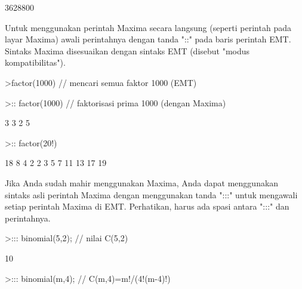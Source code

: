 \documentclass{article}
\newenvironment{eulernotebook}{\par}{\par}
\newenvironment{eulercomment}{\par\medskip}{\par\medskip}
\begin{document}
\begin{eulernotebook}
\begin{euleroutput}
                                 3628800
  
\end{euleroutput}
\begin{eulercomment}
Untuk menggunakan perintah Maxima secara langsung (seperti perintah pada layar
Maxima) awali perintahnya dengan tanda "::" pada baris perintah EMT. Sintaks
Maxima disesuaikan dengan sintaks EMT (disebut "modus kompatibilitas").
\end{eulercomment}
\begin{eulerprompt}
>factor(1000) // mencari semua faktor 1000 (EMT)
\end{eulerprompt}
\begin{euleroutput}
  [2,  2,  2,  5,  5,  5]
\end{euleroutput}
\begin{eulerprompt}
>:: factor(1000) // faktorisasi prima 1000 (dengan Maxima) 
\end{eulerprompt}
\begin{euleroutput}
  
                                   3  3
                                  2  5
  
\end{euleroutput}
\begin{eulerprompt}
>:: factor(20!)
\end{eulerprompt}
\begin{euleroutput}
  
                          18  8  4  2
                         2   3  5  7  11 13 17 19
  
\end{euleroutput}
\begin{eulercomment}
Jika Anda sudah mahir menggunakan Maxima, Anda dapat menggunakan sintaks asli
perintah Maxima dengan menggunakan tanda ":::" untuk mengawali setiap perintah
Maxima di EMT. Perhatikan, harus ada spasi antara ":::" dan perintahnya.
\end{eulercomment}
\begin{eulerprompt}
>::: binomial(5,2); // nilai C(5,2)
\end{eulerprompt}
\begin{euleroutput}
  
                                    10
  
\end{euleroutput}
\begin{eulerprompt}
>::: binomial(m,4); // C(m,4)=m!/(4!(m-4)!)
\end{eulerprompt}
\begin{euleroutput}
  

\end{euleroutput}
\end{eulernotebook}
\end{document}
